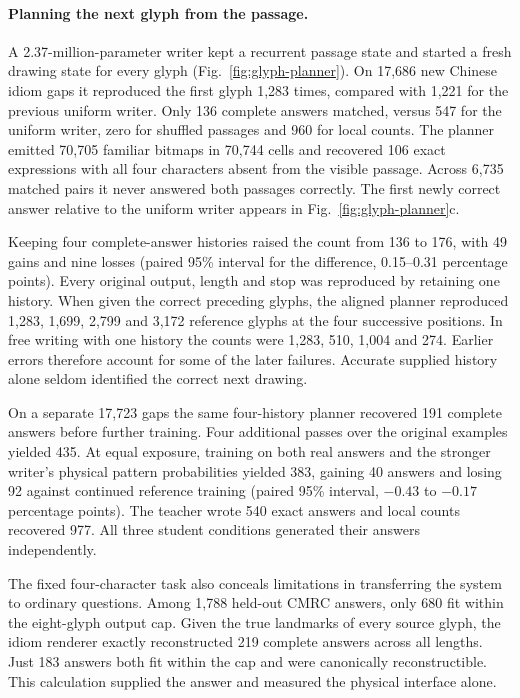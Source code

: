 \paragraph{Planning the next glyph from the passage.}
A 2.37-million-parameter writer kept a recurrent passage state and started a fresh drawing state for every glyph (Fig.~\ref{fig:glyph-planner}). On 17,686 new Chinese idiom gaps it reproduced the first glyph 1,283 times, compared with 1,221 for the previous uniform writer. Only 136 complete answers matched, versus 547 for the uniform writer, zero for shuffled passages and 960 for local counts. The planner emitted 70,705 familiar bitmaps in 70,744 cells and recovered 106 exact expressions with all four characters absent from the visible passage. Across 6,735 matched pairs it never answered both passages correctly. The first newly correct answer relative to the uniform writer appears in Fig.~\ref{fig:glyph-planner}c.

Keeping four complete-answer histories raised the count from 136 to 176, with 49 gains and nine losses (paired 95\% interval for the difference, 0.15--0.31 percentage points). Every original output, length and stop was reproduced by retaining one history. When given the correct preceding glyphs, the aligned planner reproduced 1,283, 1,699, 2,799 and 3,172 reference glyphs at the four successive positions. In free writing with one history the counts were 1,283, 510, 1,004 and 274. Earlier errors therefore account for some of the later failures. Accurate supplied history alone seldom identified the correct next drawing.

On a separate 17,723 gaps the same four-history planner recovered 191 complete answers before further training. Four additional passes over the original examples yielded 435. At equal exposure, training on both real answers and the stronger writer's physical pattern probabilities yielded 383, gaining 40 answers and losing 92 against continued reference training (paired 95\% interval, $-0.43$ to $-0.17$ percentage points). The teacher wrote 540 exact answers and local counts recovered 977. All three student conditions generated their answers independently.

The fixed four-character task also conceals limitations in transferring the system to ordinary questions. Among 1,788 held-out CMRC answers, only 680 fit within the eight-glyph output cap. Given the true landmarks of every source glyph, the idiom renderer exactly reconstructed 219 complete answers across all lengths. Just 183 answers both fit within the cap and were canonically reconstructible. This calculation supplied the answer and measured the physical interface alone.
